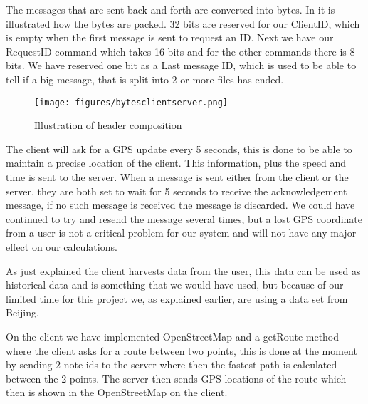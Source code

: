 The messages that are sent back and forth are converted into bytes.
In  it is illustrated how the bytes are packed.
32 bits are reserved for our ClientID, which is empty when the first message is sent to request an ID.
Next we have our RequestID command which takes 16 bits and for the other commands there is 8 bits.
We have reserved one bit as a Last message ID, which is used to be able to tell if a big message,
that is split into 2 or more files has ended.

\begin{figure}[h!]
  \centering
    \texttt{[image: figures/bytesclientserver.png]}
    \caption{Illustration of header composition}
    \label{fig:bytesclientserver}
\end{figure}

The client will ask for a GPS update every 5 seconds, this is done to be able to maintain a precise location of the client. This information, plus the speed and time is sent to the server.
When a message is sent either from the client or the server,
they are both set to wait for 5 seconds to receive the acknowledgement message, if no such message is received the message is discarded. We could have continued to try and resend the message several times, but a lost GPS coordinate from a user is not a critical problem for our system and will not have any major effect on our calculations.

As just explained the client harvests data from the user, this data can be used as historical data and is something that we would have used, but because of our limited time for this project we, as explained earlier, are using a data set from Beijing.

On the client we have implemented OpenStreetMap and a getRoute method where the client asks for a route between two points, this is done at the moment by sending 2 note ids to the server where then the fastest path is calculated between the 2 points. The server then sends GPS locations of the route which then is shown in the OpenStreetMap on the client. 		
